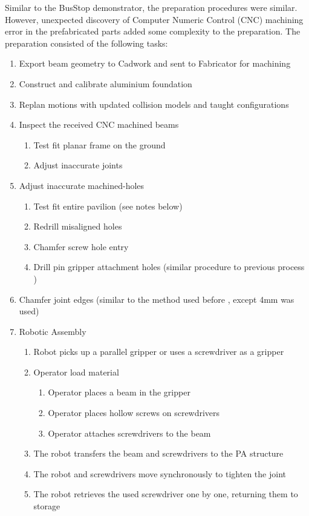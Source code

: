 Similar to the BusStop demonstrator, the preparation procedures were similar. However, unexpected discovery of Computer Numeric Control (CNC) machining error in the prefabricated parts added some complexity to the preparation. The preparation consisted of the following tasks:
\begin{enumerate}
    \item Export beam geometry to Cadwork and sent to Fabricator for machining
    \item Construct and calibrate aluminium foundation
    \item Replan motions with updated collision models and taught configurations
    \item Inspect the received CNC machined beams
    \begin{enumerate}
        \item Test fit planar frame on the ground
        \item Adjust inaccurate joints 
    \end{enumerate}
    \item Adjust inaccurate machined-holes 
    \begin{enumerate}
        \item Test fit entire pavilion (see notes below)
        \item Redrill misaligned holes
        \item Chamfer screw hole entry
        \item Drill pin gripper attachment holes (similar procedure to previous process )
    \end{enumerate}
    \item Chamfer joint edges (similar to the method used before , except 4mm was used)
    \item Robotic Assembly 
    \begin{enumerate}
        \item Robot picks up a parallel gripper or uses a screwdriver as a gripper
        \item Operator load material
        \begin{enumerate}
            \item Operator places a beam in the gripper
            \item Operator places hollow screws on screwdrivers
            \item Operator attaches screwdrivers to the beam
        \end{enumerate}
        \item The robot transfers the beam and screwdrivers to the PA structure
        \item The robot and screwdrivers move synchronously to tighten the joint
        \item The robot retrieves the used screwdriver one by one, returning them to storage
    \end{enumerate}
\end{enumerate}

